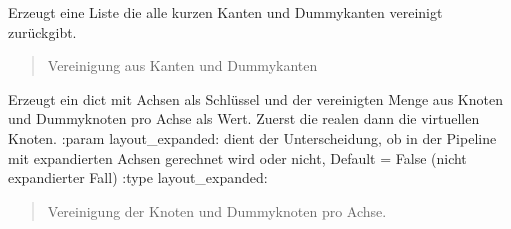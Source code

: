 \documentclass[a4paper,10pt,ngerman]{sphinxmanual}
\begin{document}
\begin{fulllineitems}
\begin{fulllineitems}
\end{fulllineitems}


\begin{fulllineitems}
\label{\detokenize{api:src.hiveplot.HivePlotLayout.fuse_edges_with_edge_dummies}}
\pysigstartsignatures
\pysiglinewithargsret
{}
{}
{}
\pysigstopsignatures
\sphinxAtStartPar
Erzeugt eine Liste die alle kurzen Kanten und Dummykanten vereinigt zurückgibt.
\begin{quote}\begin{description}
\sphinxAtStartPar
Vereinigung aus Kanten und Dummykanten

\sphinxAtStartPar
{}

\end{description}\end{quote}

\end{fulllineitems}


\begin{fulllineitems}
\label{\detokenize{api:src.hiveplot.HivePlotLayout.fuse_node_groups_with_dummies}}
\pysigstartsignatures
\pysiglinewithargsret
{}
{}
{}
\pysigstopsignatures
\sphinxAtStartPar
Erzeugt ein dict mit Achsen als Schlüssel und der vereinigten Menge aus Knoten und Dummyknoten pro Achse als Wert. Zuerst die realen dann die virtuellen Knoten.
:param layout\_expanded: dient der Unterscheidung, ob in der Pipeline mit expandierten Achsen gerechnet wird oder nicht, Default = False (nicht expandierter Fall)
:type layout\_expanded: 
\begin{quote}\begin{description}
\sphinxAtStartPar
Vereinigung der Knoten und Dummyknoten pro Achse.


\end{description}
\end{quote}
\end{fulllineitems}
\end{fulllineitems}
\end{document}
